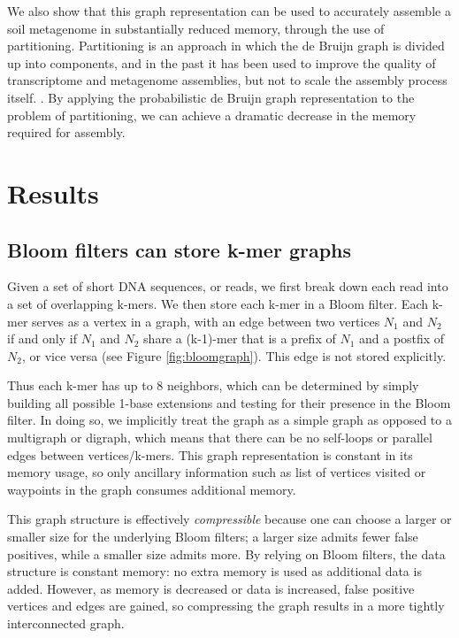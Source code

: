 \documentclass{pnastwo}
\begin{document}
\begin{article}
We also show that this graph representation can be used to accurately
assemble a soil metagenome in substantially reduced memory, through
the use of partitioning.  Partitioning is an approach in which the de
Bruijn graph is divided up into components, and in the past it has
been used to improve the quality of transcriptome and metagenome assemblies,
but not to scale the assembly process itself.
\cite{trinity, metavelvet,pubmed21685107}.  By applying the
probabilistic de Bruijn graph representation to the problem of
partitioning, we can achieve a dramatic decrease in the memory
required for assembly.


\section{Results}

\subsection{Bloom filters can store k-mer graphs}

Given a set of short DNA sequences, or reads, we first break down each
read into a set of overlapping k-mers.  We then store each k-mer
in a Bloom filter.  Each k-mer serves as a vertex in a graph, with an edge
between two vertices $N_1$ and $N_2$ if and only if $N_1$ and $N_2$
share a (k-1)-mer that is a prefix of $N_1$ and a postfix of $N_2$,
or vice versa (see Figure \ref{fig:bloomgraph}).  This edge is not stored explicitly.

Thus each k-mer has up to 8 neighbors, which can be determined by
simply building all possible 1-base extensions and testing for their
presence in the Bloom filter.  In doing so, we implicitly treat
the graph as a simple graph as opposed to a multigraph or digraph,
which means that there can be no self-loops or parallel edges between
vertices/k-mers. This graph representation is constant in its memory
usage, so only ancillary information such as list of vertices visited
or waypoints in the graph consumes additional memory.

This graph structure is effectively {\em compressible} because one can
choose a larger or smaller size for the underlying Bloom filters; a
larger size admits fewer false positives, while a smaller size admits
more. By relying on Bloom filters, the data structure is constant
memory: no extra memory is used as additional data is added. However,
as memory is decreased or data is increased, false positive vertices
and edges are gained, so compressing the graph results in a more
tightly interconnected graph.


\end{article}
\end{document}
